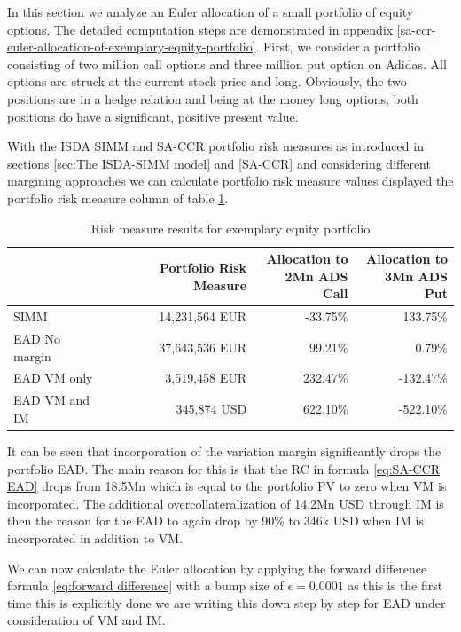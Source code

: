 \documentclass[../Thesis_AHoecherl.tex]{subfiles}
\begin{document}
    In this section we analyze an Euler allocation of a small portfolio of equity options. The detailed computation steps are demonstrated in appendix \ref{sa-ccr-euler-allocation-of-exemplary-equity-portfolio}. 
    First, we consider a portfolio consisting of two million call options and three million put option on Adidas. All options are struck at the current stock price and long. Obviously, the two positions are in a hedge relation and being at the money long options, both positions do have a significant, positive present value.
    
    With the \gls{ISDA SIMM} and \gls{SA-CCR} portfolio risk measures as introduced in sections \ref{sec:The ISDA-SIMM model} and \ref{SA-CCR} and considering different margining approaches we can calculate portfolio risk measure values displayed the portfolio risk measure column of table \ref{tab:2TradeEquityResults}.
    \begin{table}[htbp]
        \centering
        \begin{tabular}{l||r|r|r}
            & Portfolio Risk Measure & \makecell{Allocation to \\ 2Mn ADS Call} & \makecell{Allocation to \\ 3Mn ADS Put} \\
                \toprule
        SIMM  & 14,231,564 EUR & -33.75\% & 133.75\%  \\
        \gls{EAD} No margin & 37,643,536 EUR & 99.21\% & 0.79\%  \\
        \gls{EAD} \gls{VM} only & 3,519,458 EUR & 232.47\% & -132.47\%  \\
        \gls{EAD} \gls{VM} and \gls{IM} & 345,874 USD  & 622.10\% & -522.10\% \\
        \end{tabular}%
        \caption{Risk measure results for exemplary equity portfolio}
        \label{tab:2TradeEquityResults}%
    \end{table}%
    It can be seen that incorporation of the variation margin significantly drops the portfolio EAD. The main reason for this is that the RC in formula \ref{eq:SA-CCR EAD} drops from 18.5Mn which is equal to the portfolio \gls{PV} to zero when \gls{VM} is incorporated.
    The additional overcollateralization of 14.2Mn USD through \gls{IM} is then the reason for the \gls{EAD} to again drop by 90\% to 346k USD when \gls{IM} is incorporated in addition to \gls{VM}.

    We can now calculate the Euler allocation by applying the forward difference formula \ref{eq:forward difference} with a bump size of $\epsilon = 0.0001$ as this is the first time this is explicitly done we are writing this down step by step for \gls{EAD} under consideration of \gls{VM} and IM.
\end{document}
